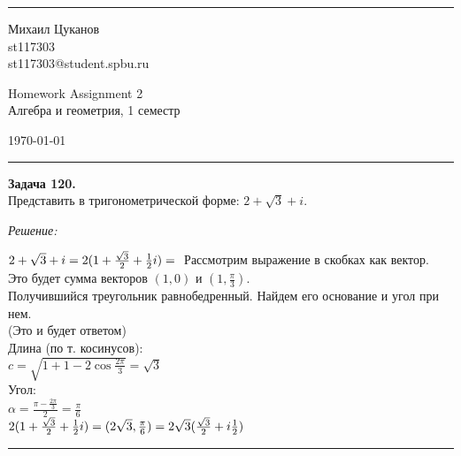 \documentclass[a4paper, 12pt]{article} %
\newenvironment{problem}[2][Задача]
    { \begin{mdframed}[backgroundcolor=gray!10] \textbf{#1 #2.} \\}
    {  \end{mdframed}}
\newenvironment{solution}
    {\textit{Решение: }}
    {\noindent\rule{7in}{1.5pt}}
\begin{document}

\fancyhead[C]{}
\hrule \medskip %
\begin{minipage}{0.295\textwidth}
\raggedright\footnotesize
Михаил Цуканов \hfill\\
st117303 \hfill\\
st117303@student.spbu.ru
\end{minipage}
\begin{minipage}{0.4\textwidth}
\centering\large
Homework Assignment 2\\
\normalsize
Алгебра и геометрия, 1 семестр\\
\end{minipage}
\begin{minipage}{0.295\textwidth}
\raggedleft
\today\hfill\\
\end{minipage}
\medskip\hrule
\bigskip


\begin{problem}{120}
Представить в тригонометрической форме: $2+\sqrt{3}+i$.
\end{problem}
\begin{solution}

$
2 + \sqrt3 + i = \\
2(1 + \frac{\sqrt3}{2} + \frac{1}{2}i) = \\
$
Рассмотрим выражение в скобках как вектор. \\
Это будет сумма векторов $(1, 0)$ и $(1, \frac{\pi}{3})$. \\
Получившийся треугольник равнобедренный. Найдем его основание и угол при нем. \\
(Это и будет ответом) \\
Длина (по т. косинусов): \\
$c = \sqrt{1 + 1 - 2\cos{\frac{2\pi}{3}}} = \sqrt3$ \\
Угол: \\
$\alpha = \frac{\pi - \frac{2\pi}{3}}{2} = \frac{\pi}{6}$ \\
$
2(1 + \frac{\sqrt3}{2} + \frac{1}{2}i) =
(2\sqrt3, \frac{\pi}{6}) =
2\sqrt3(\frac{\sqrt3}{2} + i\frac{1}{2})\\
$

\end{solution}
\end{document}
